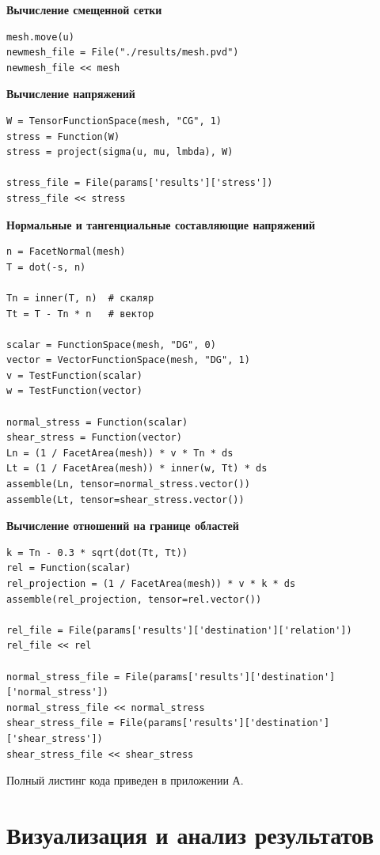 \documentclass[a4paper, 14pt]{extreport}
\begin{document}
\textbf{Вычисление смещенной сетки}

\begin{lstlisting}
mesh.move(u)
newmesh_file = File("./results/mesh.pvd")
newmesh_file << mesh
\end{lstlisting}

\textbf{Вычисление напряжений}

\begin{lstlisting}
W = TensorFunctionSpace(mesh, "CG", 1)
stress = Function(W)
stress = project(sigma(u, mu, lmbda), W)

stress_file = File(params['results']['stress'])
stress_file << stress
\end{lstlisting}

\textbf{Нормальные и тангенциальные составляющие напряжений}

\begin{lstlisting}
n = FacetNormal(mesh)
T = dot(-s, n)

Tn = inner(T, n)  # скаляр
Tt = T - Tn * n   # вектор

scalar = FunctionSpace(mesh, "DG", 0)
vector = VectorFunctionSpace(mesh, "DG", 1)
v = TestFunction(scalar)
w = TestFunction(vector)

normal_stress = Function(scalar)
shear_stress = Function(vector)
Ln = (1 / FacetArea(mesh)) * v * Tn * ds
Lt = (1 / FacetArea(mesh)) * inner(w, Tt) * ds
assemble(Ln, tensor=normal_stress.vector())
assemble(Lt, tensor=shear_stress.vector())
\end{lstlisting}

\textbf{Вычисление отношений на границе областей}

\begin{lstlisting}
k = Tn - 0.3 * sqrt(dot(Tt, Tt))
rel = Function(scalar)
rel_projection = (1 / FacetArea(mesh)) * v * k * ds
assemble(rel_projection, tensor=rel.vector())

rel_file = File(params['results']['destination']['relation'])
rel_file << rel

normal_stress_file = File(params['results']['destination']['normal_stress'])
normal_stress_file << normal_stress
shear_stress_file = File(params['results']['destination']['shear_stress'])
shear_stress_file << shear_stress
\end{lstlisting}

Полный листинг кода приведен в приложении А.

\section{Визуализация и анализ результатов}
\end{document}
